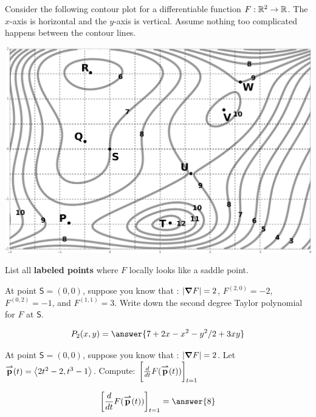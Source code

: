 \documentclass{ximera}
\author{Bart Snapp}
\begin{document}
Consider the following contour plot for a differentiable function $F :
\mathbb R^2 \to \mathbb R$.  The $x$-axis is horizontal and the $y$-axis is
vertical.  Assume nothing too complicated happens between the contour
lines.
\begin{image}[4in]
  \includegraphics{contourPlot.png}
\end{image}

\begin{problem}
List all \textbf{labeled points} where $F$ locally looks like a
saddle point.
\begin{prompt}
  \begin{selectAll}
  \end{selectAll}
\end{prompt}
\vfill
\end{problem}

\begin{problem}
  At point $\mathsf{S}=(0,0)$, suppose you know that : $|\boldsymbol\nabla F|=2$,
  $F^{(2,0)} = -2$, $F^{(0,2)} = -1$, and $F^{(1,1)}= 3$. Write down
  the second degree Taylor polynomial for $F$ at $\mathsf{S}$.
  \begin{prompt}
    \[
    P_2(x,y) = \answer{7+2x -x^2 -y^2/2+3xy}
    \]
  \end{prompt}
  \vfill
\end{problem}


\begin{problem}
  At point $\mathsf{S}=(0,0)$, suppose you know that : $|\boldsymbol\nabla F|=2$.
  Let ${\overset{\boldsymbol{\rightharpoonup}}{\mathbf{p}}}(t)= \left\langle 2t^2-2,t^3-1\right\rangle$. Compute:
  $\bigg[ \frac{\mathop{}\!d }{\mathop{}\!d t}F({\overset{\boldsymbol{\rightharpoonup}}{\mathbf{p}}}(t)) \bigg]_{t=1}$
  \begin{prompt}
    \[
    \eval{\dd{t}F(\vec{p}(t))}_{t=1} = \answer{8}
    \]
  \end{prompt}
  \vfill
\end{problem}
\end{document}
